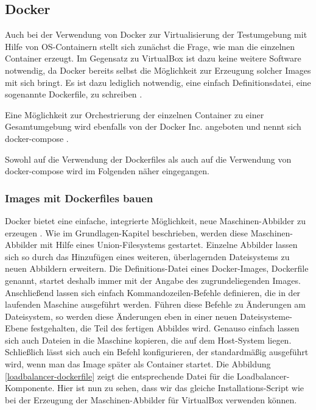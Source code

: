 \subsection{Docker}

Auch bei der Verwendung von Docker zur Virtualisierung der Testumgebung mit Hilfe von OS-Containern stellt sich zunächst die Frage, wie man die einzelnen Container erzeugt. Im Gegensatz zu VirtualBox ist dazu keine weitere Software notwendig, da Docker bereits selbst die Möglichkeit zur Erzeugung solcher Images mit sich bringt. Es ist dazu lediglich notwendig, eine einfach Definitionsdatei, eine sogenannte Dockerfile, zu schreiben \citep[Vgl.][]{docker:003}.

Eine Möglichkeit zur Orchestrierung der einzelnen Container zu einer Gesamtumgebung wird ebenfalls von der Docker Inc. angeboten und nennt sich docker-compose \citep[Vgl.][]{dockercompose}.

Sowohl auf die Verwendung der Dockerfiles als auch auf die Verwendung von docker-compose wird im Folgenden näher eingegangen.

\subsubsection{Images mit Dockerfiles bauen}

Docker bietet eine einfache, integrierte Möglichkeit, neue Maschinen-Abbilder zu erzeugen \citep[Vgl.][]{docker:003}. Wie im Grundlagen-Kapitel beschrieben, werden diese Maschinen-Abbilder mit Hilfe eines Union-Filesystems gestartet. Einzelne Abbilder lassen sich so durch das Hinzufügen eines weiteren, überlagernden Dateisystems zu neuen Abbildern erweitern. Die Definitions-Datei eines Docker-Images, Dockerfile genannt, startet deshalb immer mit der Angabe des zugrundeliegenden Images. Anschließend lassen sich einfach Kommandozeilen-Befehle definieren, die in der laufenden Maschine ausgeführt werden. Führen diese Befehle zu Änderungen am Dateisystem, so werden diese Änderungen eben in einer neuen Dateisysteme-Ebene festgehalten, die Teil des fertigen Abbildes wird. Genauso einfach lassen sich auch Dateien in die Maschine kopieren, die auf dem Host-System liegen. Schließlich lässt sich auch ein Befehl konfigurieren, der standardmäßig ausgeführt wird, wenn man das Image später als Container startet. Die Abbildung \ref{loadbalancer-dockerfile} zeigt die entsprechende Datei für die Loadbalancer-Komponente. Hier ist nun zu sehen, dass wir das gleiche Installations-Script wie bei der Erzeugung der Maschinen-Abbilder für VirtualBox verwenden können.

